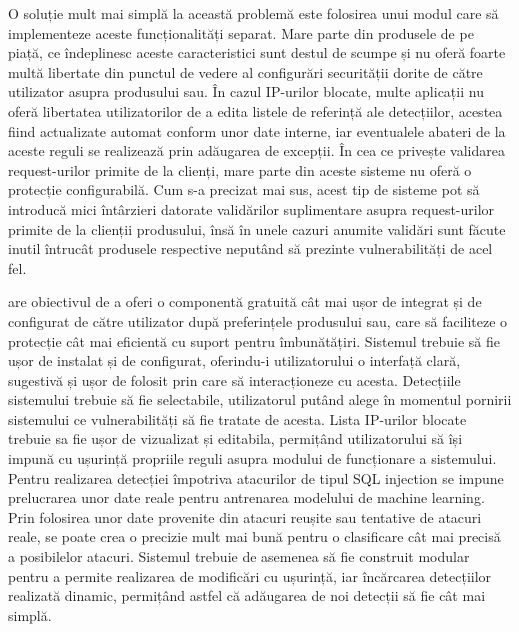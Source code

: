 O soluție mult mai simplă la această problemă este folosirea unui modul care să implementeze aceste funcționalități separat. Mare parte din produsele de pe piață, ce îndeplinesc aceste caracteristici sunt destul de scumpe și nu oferă foarte multă libertate din punctul de vedere al configurări securității dorite de către utilizator asupra produsului sau. În cazul IP-urilor blocate, multe aplicații nu oferă libertatea utilizatorilor de a edita listele de referință ale detecțiilor, acestea fiind actualizate automat conform unor date interne, iar eventualele abateri de la aceste reguli se realizează prin adăugarea de excepții. În cea ce privește validarea request-urilor primite de la clienți, mare parte din aceste sisteme nu oferă o protecție configurabilă. Cum s-a precizat mai sus, acest tip de sisteme pot să introducă mici întârzieri datorate validărilor suplimentare asupra request-urilor primite de la clienții produsului, însă în unele cazuri anumite validări sunt făcute inutil întrucât produsele respective neputând să prezinte vulnerabilități de acel fel. 

 \textit{\thesistitle}  are obiectivul de a oferi o componentă gratuită cât mai ușor de integrat și de configurat de către utilizator după preferințele produsului sau, care să faciliteze o protecție cât mai eficientă cu suport pentru îmbunătățiri. Sistemul trebuie să fie ușor de instalat și de configurat, oferindu-i utilizatorului o interfață clară, sugestivă și ușor de folosit prin care să interacționeze cu acesta. Detecțiile sistemului trebuie să fie selectabile, utilizatorul putând alege în momentul pornirii sistemului ce vulnerabilități să fie tratate de acesta. Lista IP-urilor blocate trebuie sa fie ușor de vizualizat și editabila, permițând utilizatorului să își impună cu ușurință propriile reguli asupra modului de funcționare a sistemului. Pentru realizarea detecției împotriva atacurilor de tipul SQL injection se impune prelucrarea unor date reale pentru antrenarea modelului de machine learning. Prin folosirea unor date provenite din atacuri reușite sau tentative de atacuri reale, se poate crea o precizie mult mai bună pentru o clasificare cât mai precisă a posibilelor atacuri. Sistemul trebuie de asemenea să fie construit modular pentru a permite realizarea de modificări cu ușurință, iar încărcarea detecțiilor realizată dinamic, permițând astfel că adăugarea de noi detecții să fie cât mai simplă. 




